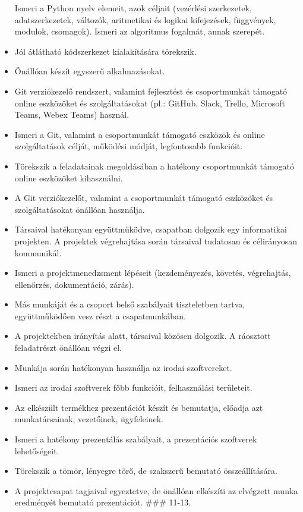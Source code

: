 \begin{itemize}
  Ismeri a Python nyelv elemeit, azok céljait (vezérlési szerkezetek,
  adatszerkezetek, változók, aritmetikai és logikai kifejezések,
  függvények, modulok, csomagok). Ismeri az algoritmus fogalmát, annak
  szerepét.
\item
  Jól átlátható kódszerkezet kialakítására törekszik.
\item
  Önállóan készít egyszerű alkalmazásokat.
\item
  Git verziókezelő rendszert, valamint fejlesztést és csoportmunkát
  támogató online eszközöket és szolgáltatásokat (pl.: GitHub, Slack,
  Trello, Microsoft Teams, Webex Teams) használ.
\item
  Ismeri a Git, valamint a csoportmunkát támogató eszközök és online
  szolgáltatások célját, működési módját, legfontosabb funkcióit.
\item
  Törekszik a feladatainak megoldásában a hatékony csoportmunkát
  támogató online eszközöket kihasználni.
\item
  A Git verziókezelőt, valamint a csoportmunkát támogató eszközöket és
  szolgáltatásokat önállóan használja.
\item
  Társaival hatékonyan együttműködve, csapatban dolgozik egy
  informatikai projekten. A projektek végrehajtása során társaival
  tudatosan és célirányosan kommunikál.
\item
  Ismeri a projektmenedzsment lépéseit (kezdeményezés, követés,
  végrehajtás, ellenőrzés, dokumentáció, zárás).
\item
  Más munkáját és a csoport belső szabályait tiszteletben tartva,
  együttműködően vesz részt a csapatmunkában.
\item
  A projektekben irányítás alatt, társaival közösen dolgozik. A
  ráosztott feladatrészt önállóan végzi el.
\item
  Munkája során hatékonyan használja az irodai szoftvereket.
\item
  Ismeri az irodai szoftverek főbb funkcióit, felhasználási területeit.
\item
  Az elkészült termékhez prezentációt készít és bemutatja, előadja azt
  munkatársainak, vezetőinek, ügyfeleinek.
\item
  Ismeri a hatékony prezentálás szabályait, a prezentációs szoftverek
  lehetőségeit.
\item
  Törekszik a tömör, lényegre törő, de szakszerű bemutató
  összeállítására.
\item
  A projektcsapat tagjaival egyeztetve, de önállóan elkészíti az
  elvégzett munka eredményét bemutató prezentációt. \#\#\# 11-13.

\end{itemize}
